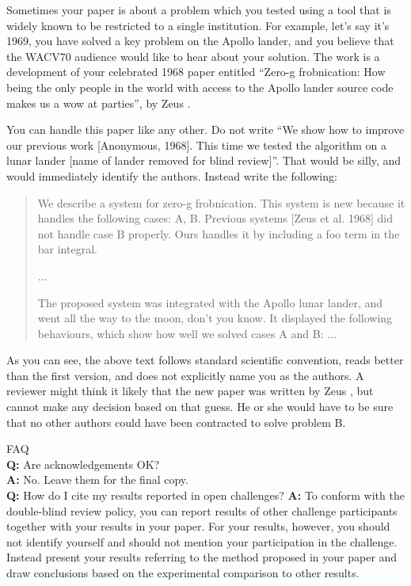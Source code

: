 \documentclass[10pt,twocolumn,letterpaper]{article}
\begin{document}
Sometimes your paper is about a problem which you tested using a tool that is widely known to be restricted to a single institution.
For example, let's say it's 1969, you have solved a key problem on the Apollo lander, and you believe that the WACV70 audience would like to hear about your
solution.
The work is a development of your celebrated 1968 paper entitled ``Zero-g frobnication: How being the only people in the world with access to the Apollo lander source code makes us a wow at parties'', by Zeus \etal.

You can handle this paper like any other.
Do not write ``We show how to improve our previous work [Anonymous, 1968].
This time we tested the algorithm on a lunar lander [name of lander removed for blind review]''.
That would be silly, and would immediately identify the authors.
Instead write the following:
\begin{quotation}
\noindent
   We describe a system for zero-g frobnication.
   This system is new because it handles the following cases:
   A, B.  Previous systems [Zeus et al. 1968] did not  handle case B properly.
   Ours handles it by including a foo term in the bar integral.

   ...

   The proposed system was integrated with the Apollo lunar lander, and went all the way to the moon, don't you know.
   It displayed the following behaviours, which show how well we solved cases A and B: ...
\end{quotation}
As you can see, the above text follows standard scientific convention, reads better than the first version, and does not explicitly name you as the authors.
A reviewer might think it likely that the new paper was written by Zeus \etal, but cannot make any decision based on that guess.
He or she would have to be sure that no other authors could have been contracted to solve problem B.
\medskip

\noindent
FAQ\medskip\\
{\bf Q:} Are acknowledgements OK?\\
{\bf A:} No.  Leave them for the final copy.\medskip\\
{\bf Q:} How do I cite my results reported in open challenges?
{\bf A:} To conform with the double-blind review policy, you can report results of other challenge participants together with your results in your paper.
For your results, however, you should not identify yourself and should not mention your participation in the challenge.
Instead present your results referring to the method proposed in your paper and draw conclusions based on the experimental comparison to other results.\medskip\\
\end{document}
